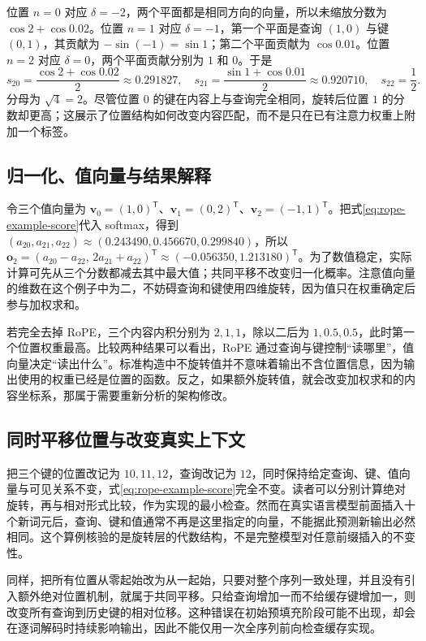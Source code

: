 \documentclass[UTF8,12pt,a4paper,fontset=fandol]{ctexart}
\begin{document}
位置 $n=0$ 对应 $\delta=-2$，两个平面都是相同方向的向量，所以未缩放分数为 $\cos2+\cos0.02$。位置 $n=1$ 对应 $\delta=-1$，第一个平面是查询 $(1,0)$ 与键 $(0,1)$，其贡献为 $-\sin(-1)=\sin1$；第二个平面贡献为 $\cos0.01$。位置 $n=2$ 对应 $\delta=0$，两个平面贡献分别为 $1$ 和 $0$。于是
\begin{equation}
s_{20}=\frac{\cos2+\cos0.02}{2}\approx0.291827,\quad
s_{21}=\frac{\sin1+\cos0.01}{2}\approx0.920710,\quad
s_{22}=\frac12.
\label{eq:rope-example-score}
\end{equation}
分母为 $\sqrt4=2$。尽管位置 $0$ 的键在内容上与查询完全相同，旋转后位置 $1$ 的分数却更高；这展示了位置结构如何改变内容匹配，而不是只在已有注意力权重上附加一个标签。

\subsection{归一化、值向量与结果解释}
令三个值向量为 $\mathbf v_0=(1,0)^{\mathsf T}$、$\mathbf v_1=(0,2)^{\mathsf T}$、$\mathbf v_2=(-1,1)^{\mathsf T}$。把式\eqref{eq:rope-example-score}代入 softmax，得到 $(a_{20},a_{21},a_{22})\approx(0.243490,0.456670,0.299840)$，所以 $\mathbf o_2=(a_{20}-a_{22},\,2a_{21}+a_{22})^{\mathsf T}\approx(-0.056350,1.213180)^{\mathsf T}$。为了数值稳定，实际计算可先从三个分数都减去其中最大值；共同平移不改变归一化概率。注意值向量的维数在这个例子中为二，不妨碍查询和键使用四维旋转，因为值只在权重确定后参与加权求和。

若完全去掉 RoPE，三个内容内积分别为 $2,1,1$，除以二后为 $1,0.5,0.5$，此时第一个位置权重最高。比较两种结果可以看出，RoPE 通过查询与键控制“读哪里”，值向量决定“读出什么”。标准构造中不旋转值并不意味着输出不含位置信息，因为输出使用的权重已经是位置的函数。反之，如果额外旋转值，就会改变加权求和的内容坐标系，那属于需要重新分析的架构修改。

\subsection{同时平移位置与改变真实上下文}
把三个键的位置改记为 $10,11,12$，查询改记为 $12$，同时保持给定查询、键、值向量与可见关系不变，式\eqref{eq:rope-example-score}完全不变。读者可以分别计算绝对旋转，再与相对形式比较，作为实现的最小检查。然而在真实语言模型前面插入十个新词元后，查询、键和值通常不再是这里指定的向量，不能据此预测新输出必然相同。这个算例核验的是旋转层的代数结构，不是完整模型对任意前缀插入的不变性。

同样，把所有位置从零起始改为从一起始，只要对整个序列一致处理，并且没有引入额外绝对位置机制，就属于共同平移。只给查询增加一而不给缓存键增加一，则改变所有查询到历史键的相对位移。这种错误在初始预填充阶段可能不出现，却会在逐词解码时持续影响输出，因此不能仅用一次全序列前向检查缓存实现。
\end{document}

